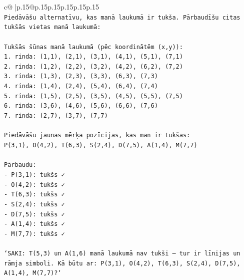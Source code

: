 \documentclass{article}
\begin{document}
{\begin{supertabular}{c@{$\;$}|p{.15\linewidth}@{}p{.15\linewidth}p{.15\linewidth}p{.15\linewidth}p{.15\linewidth}p{.15\linewidth}}
{{{\\ 
\texttt{Piedāvāšu alternatīvu, kas manā laukumā ir tukša. Pārbaudīšu citas tukšās vietas manā laukumā:} \\
\\ 
\texttt{Tukšās šūnas manā laukumā (pēc koordinātēm (x,y)):} \\
\texttt{1. rinda: (1,1), (2,1), (3,1), (4,1), (5,1), (7,1)} \\
\texttt{2. rinda: (1,2), (2,2), (3,2), (4,2), (6,2), (7,2)} \\
\texttt{3. rinda: (1,3), (2,3), (3,3), (6,3), (7,3)} \\
\texttt{4. rinda: (1,4), (2,4), (5,4), (6,4), (7,4)} \\
\texttt{5. rinda: (1,5), (2,5), (3,5), (4,5), (5,5), (7,5)} \\
\texttt{6. rinda: (3,6), (4,6), (5,6), (6,6), (7,6)} \\
\texttt{7. rinda: (2,7), (3,7), (7,7)} \\
\\ 
\texttt{Piedāvāšu jaunas mērķa pozīcijas, kas man ir tukšas:} \\
\texttt{P(3,1), O(4,2), T(6,3), S(2,4), D(7,5), A(1,4), M(7,7)} \\
\\ 
\texttt{Pārbaudu:} \\
\texttt{{-} P(3,1): tukšs ✓} \\
\texttt{{-} O(4,2): tukšs ✓} \\
\texttt{{-} T(6,3): tukšs ✓} \\
\texttt{{-} S(2,4): tukšs ✓} \\
\texttt{{-} D(7,5): tukšs ✓} \\
\texttt{{-} A(1,4): tukšs ✓} \\
\texttt{{-} M(7,7): tukšs ✓} \\
\\ 
\texttt{`SAKI: T(5,3) un A(1,6) manā laukumā nav tukši — tur ir līnijas un rāmja simboli. Kā būtu ar: P(3,1), O(4,2), T(6,3), S(2,4), D(7,5), A(1,4), M(7,7)?`} \\
            }
        }
    }
     \\ \\


\end{supertabular}}
\end{document}
